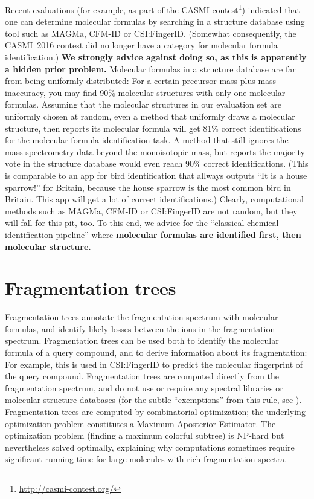 \documentclass[letterpaper,10pt,openany,oneside]{sphinxmanual}
\begin{document}
Recent evaluations (for example, as part of the CASMI
contest\footnote{\sphinxAtStartFootnote\url{http://casmi-contest.org/}})
indicated that one can determine molecular formulas by searching in a
structure database using tool such as MAGMa, CFM-ID or CSI:FingerID.
(Somewhat consequently, the CASMI~2016 contest did no longer have a category
for molecular formula identification.)  \textbf{We strongly advice against
doing so, as this is apparently a hidden prior problem.}  Molecular formulas
in a structure database are far from being uniformly distributed: For a
certain precursor mass plus mass inaccuracy, you may find 90\% molecular
structures with only one molecular formulas.  Assuming that the molecular
structures in our evaluation set are uniformly chosen at random, even a
method that uniformly draws a molecular structure, then reports its molecular
formula will get 81\% correct identifications for the molecular formula
identification task.  A method that still ignores the mass spectrometry data
beyond the monoisotopic mass, but reports the majority vote in the structure
database would even reach 90\% correct identifications.  (This is comparable
to an app for bird identification that allways outputs ``It is a house
sparrow!'' for Britain, because the house sparrow is the most common bird in
Britain.  This app will get a lot of correct identifications.)  Clearly,
computational methods such as MAGMa, CFM-ID or CSI:FingerID are not random,
but they will fall for this pit, too.  To this end, we advice for the
``classical chemical identification pipeline'' where \textbf{molecular
formulas are identified first, then molecular structure.}



\section{Fragmentation trees}

Fragmentation trees annotate the fragmentation spectrum with molecular
formulas, and identify likely losses between the ions in the fragmentation
spectrum.  Fragmentation trees can be used both to identify the molecular
formula of a query compound, and to derive information about its
fragmentation: For example, this is used in CSI:FingerID to predict the
molecular fingerprint of the query compound.  Fragmentation trees are
computed directly from the fragmentation spectrum, and do not use or require
any spectral libraries or molecular structure databases (for the subtle
``exemptions'' from this rule, see \citet{boecker16fragmentation}).
Fragmentation trees are computed by combinatorial optimization; the
underlying optimization problem constitutes a Maximum Aposterior Estimator.
The optimization problem (finding a maximum colorful subtree) is NP-hard but
nevertheless solved optimally, explaining why computations sometimes require
significant running time for large molecules with rich fragmentation spectra.
\end{document}
